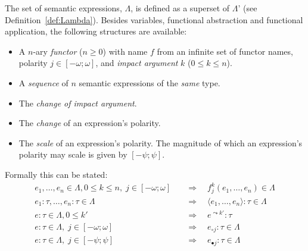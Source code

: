 \begin{definition}
The set of semantic expressions, $\Lambda$, is defined as a superset of $\Lambda$' (see Definition~\ref{def:Lambda}). Besides variables, functional abstraction and functional application, the following structures are available:
\begin{itemize}
  \item A $n$-ary \emph{functor} ($n \geq 0$) with name $f$ from an infinite set of functor names, polarity $j \in [-\omega;\omega]$, and \emph{impact argument} $k$ ($0 \leq k \leq n$).
  \item A \emph{sequence} of $n$ semantic expressions of the \emph{same} type.
  \item The \emph{change of impact argument}.
  \item The \emph{change} of an expression's polarity.
  \item The \emph{scale} of an expression's polarity. The magnitude of which an expression's polarity may scale is given by $[-\psi; \psi]$.
\end{itemize}

Formally this can be stated:
\begin{align}
 e_1, \ldots, e_n \in \Lambda, 0 \leq k \leq n, \; j \in [-\omega;\omega]         &\quad \Rightarrow \quad f^k_j(e_1, \ldots, e_n) \in \Lambda \tag{Functor} \\
 e_1 : \tau, \ldots, e_n : \tau \in \Lambda     &\quad \Rightarrow \quad  \langle e_1, \ldots, e_n \rangle  : \tau \in \Lambda \tag{Sequence} \\
 e : \tau \in \Lambda, 0 \leq k' &\quad \Rightarrow \quad e^{\leadsto k'} : \tau \tag{Impact change} \\
 e : \tau \in \Lambda, \; j \in [-\omega;\omega]      &\quad \Rightarrow \quad  e_{\circ
 j}  : \tau \in \Lambda \tag{Change}  \\ 
 e : \tau \in \Lambda, \; j \in [-\psi;\psi]      &\quad \Rightarrow \quad  e_{\bullet j}  : \tau \in \Lambda \tag{Scale} 
\end{align}
\vspace{.3em}
\label{def:semanticExpressions}
\done
\end{definition}

